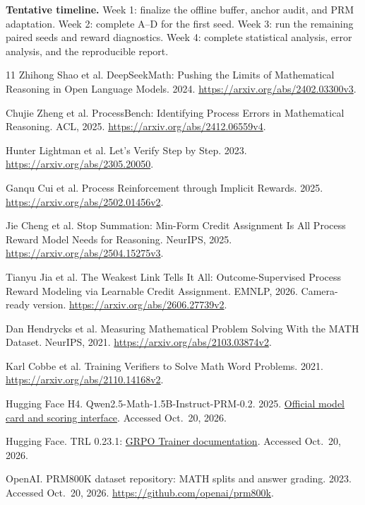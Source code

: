 \documentclass{article}
\begin{document}
\textbf{Tentative timeline.} Week 1: finalize the offline buffer, anchor audit, and PRM adaptation. Week 2: complete A--D for the first seed. Week 3: run the remaining paired seeds and reward diagnostics. Week 4: complete statistical analysis, error analysis, and the reproducible report.
\clearpage
\begin{thebibliography}{11}
Zhihong Shao et al. DeepSeekMath: Pushing the Limits of Mathematical Reasoning in Open Language Models. 2024.
\url{https://arxiv.org/abs/2402.03300v3}.

Chujie Zheng et al. ProcessBench: Identifying Process Errors in Mathematical Reasoning. ACL, 2025.
\url{https://arxiv.org/abs/2412.06559v4}.

Hunter Lightman et al. Let's Verify Step by Step. 2023.
\url{https://arxiv.org/abs/2305.20050}.

Ganqu Cui et al. Process Reinforcement through Implicit Rewards. 2025.
\url{https://arxiv.org/abs/2502.01456v2}.

Jie Cheng et al. Stop Summation: Min-Form Credit Assignment Is All Process Reward Model Needs for Reasoning. NeurIPS, 2025.
\url{https://arxiv.org/abs/2504.15275v3}.

Tianyu Jia et al. The Weakest Link Tells It All: Outcome-Supervised Process Reward Modeling via Learnable Credit Assignment. EMNLP, 2026. Camera-ready version.
\url{https://arxiv.org/abs/2606.27739v2}.

Dan Hendrycks et al. Measuring Mathematical Problem Solving With the MATH Dataset. NeurIPS, 2021.
\url{https://arxiv.org/abs/2103.03874v2}.

Karl Cobbe et al. Training Verifiers to Solve Math Word Problems. 2021.
\url{https://arxiv.org/abs/2110.14168v2}.

Hugging Face H4. Qwen2.5-Math-1.5B-Instruct-PRM-0.2. 2025.
\href{https://huggingface.co/HuggingFaceH4/Qwen2.5-Math-1.5B-Instruct-PRM-0.2}{Official model card and scoring interface}. Accessed Oct.\ 20, 2026.

Hugging Face. TRL 0.23.1: \href{https://huggingface.co/docs/trl/v0.23.1/grpo_trainer}{GRPO Trainer documentation}. Accessed Oct.\ 20, 2026.

OpenAI. PRM800K dataset repository: MATH splits and answer grading. 2023. Accessed Oct.\ 20, 2026.
\url{https://github.com/openai/prm800k}.
\end{thebibliography}
\end{document}
